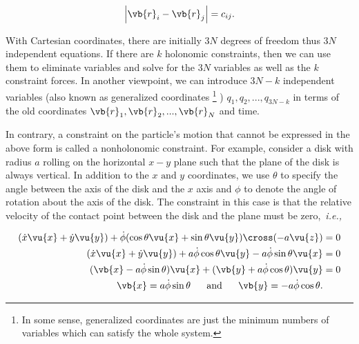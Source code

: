 \documentclass[a4paper,12pt]{report}
\begin{document}
\begin{equation}
	\left| \vb{r} _{i} - \vb{r} _{j}  \right| = c_{ij} .
\end{equation}

With Cartesian coordinates, there are initially \(3N\) degrees of freedom thus \(3N\) independent equations. If there are \(k\) holonomic constraints, then we can use them to eliminate variables and solve for the \(3N\) variables as well as the \(k\) constraint forces. In another viewpoint, we can introduce \(3N - k\) independent variables (also known as generalized coordinates \footnote{In some sense, generalized coordinates are just the minimum numbers of variables which can satisfy the whole system.} ) \(q_{1} , q_{2}, ...,q_{3N - k} \) in terms of the old coordinates \(\vb{r} _{1} , \vb{r} _{2} , ..., \vb{r} _{N} \) and time.  

In contrary, a constraint on the particle's motion that cannot be expressed in the above form is called a nonholonomic constraint. For example, consider a disk with radius \(a\) rolling on the horizontal \(x-y\) plane such that the plane of the disk is always vertical. In addition to the \(x \text{ and }  y\) coordinates, we use \(\theta \) to specify the angle between the axis of the disk and the \(x\) axis and \(\phi \) to denote the angle of rotation about the axis of the disk. The constraint in this case is that the relative velocity of the contact point between the disk and the plane must be zero, \textit{i.e.,} 

\begin{equation}
\begin{aligned}
	(\dot{x} \vu{x} + \dot{y} \vu{y} ) + \dot{\phi } (\cos \theta \vu{x} + \sin \theta \vu{y} ) \cross (-a\vu{z} ) &= 0 \\
	(\dot{x} \vu{x} + \dot{y} \vu{y} ) + a\dot{\phi } \cos \theta \vu{y} - a\dot{\phi } \sin \theta \vu{x} &= 0 \\
	(\vb{x} - a\dot{\phi } \sin \theta) \vu{x} + (\vb{y} + a\dot{\phi } \cos \theta)\vu{y} &= 0 \\
	\vb{x} = a\dot{\phi } \sin \theta ~~~~\text{ and }~~~~ \vb{y} = -a\dot{\phi } \cos \theta.
\end{aligned}
\end{equation}
\end{document}
